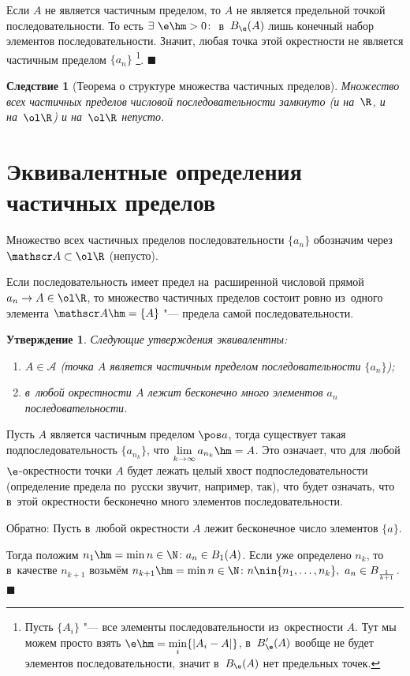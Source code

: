 \documentclass[a4paper,10pt,twoside]{article}
\newtheorem{Sl}{Следствие}[section]
\newtheorem{Ut}{Утверждение}[section]
\newenvironment{Proof}
       {\par\noindent{\textbf{Доказательство.}}}
       {\hfill$\scriptstyle\blacksquare$}
\let\AVsection\section{}
\renewcommand\section{\newpage\scol\AVsection}
\newcommand{\scol}{  \renewcommand{\headrulewidth}{0.5pt}\fancyhead[RE,LO]{\thesection{} \leftmark} \fancyhead[LE,RO]{\thepage}}
\begin{document}
\begin{Proof}
Если $A$ не является частичным пределом, то $A$ не является предельной точкой последовательности.
То есть $\exists\  \e\hm>0\colon$ в~$B_\e(A)$ лишь конечный набор элементов последовательности.
Значит, любая точка этой окрестности не является частичным пределом $\{a_n\}$
\footnote{Пусть $\{A_i\}$ "--- все элементы последовательности из~окрестности $A$. 
Тут мы можем просто взять $\e\hm=\min\limits_{i}\{|A_i-A|\}$, в~$B'_\e(A)$ вообще не 
будет элементов последовательности, значит в~$B_\e(A)$ нет предельных точек.}.
\end{Proof}

\begin{Sl}[Теорема о структуре множества частичных пределов]
Множество всех частичных пределов числовой последовательности замкнуто
(и на~$\R$, и на~$\ol\R$) и на~$\ol\R$ непусто.

\end{Sl}

\section{Эквивалентные определения частичных пределов}
Множество всех частичных пределов последовательности $\{a_n\}$ обозначим через $\mathscr A\subset\ol\R$ (непусто).

Если последовательность имеет предел на~расширенной числовой прямой $a_n\to A\in\ol\R$, 
то множество частичных пределов состоит ровно из~одного элемента $\mathscr A\hm=\{A\}$ "--- предела самой последовательности.

\begin{Ut} Следующие утверждения эквивалентны:

\begin{enumerate}
\item $A\in\mathscr A$ (точка $A$ является частичным пределом последовательности $\{a_n\}$);

\item в~любой окрестности $A$ лежит бесконечно много элементов $a_n$ последовательности.
\end{enumerate}
\end{Ut}

\begin{Proof}
Пусть $A$ является частичным пределом $\pos a$, тогда
существует такая подпоследовательность $\{a_{n_k}\}$, что $\lim\limits_{k\to\infty}a_{n_k}\hm=A$. Это означает, что для любой $\e$-окрестности точки $A$ будет лежать целый хвост подпоследовательности (определение предела по~русски звучит, например, так), что будет означать, что в~этой окрестности бесконечно много элементов последовательности.

Обратно: Пусть в~любой окрестности $A$ лежит бесконечное число элементов $\{a\}$.

Тогда положим $n_1\hm=\min n\in\N\colon a_n\in B_1(A)$. Если уже определено $n_k$, то в~качестве $n_{k+1}$ возьмём $n_{k+1}\hm=\min n\in\N\colon
n\nin\{n_1,\ldots,n_k\},\ a_n\in B_{\frac1{k+1}}$.
\end{Proof}
\end{document}
